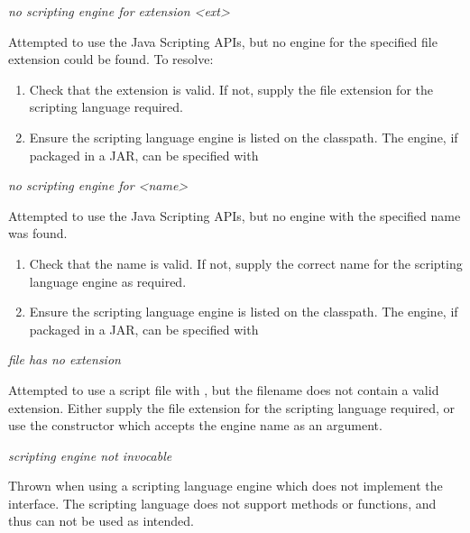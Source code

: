 \noindent
\textit{no scripting engine for extension <ext>}
\begin{indented}
  Attempted to use the Java Scripting APIs, but no engine for the specified file extension could be found.  To resolve:
  \begin{enumerate}
    \item Check that the extension is valid.  If not, supply the file extension for the scripting language required.
    \item Ensure the scripting language engine is listed on the classpath.  The engine, if packaged in a JAR, can be specified with
      \begin{indented}
      \end{indented}
  \end{enumerate}
\end{indented}

\noindent
\textit{no scripting engine for <name>}
\begin{indented}
  Attempted to use the Java Scripting APIs, but no engine with the specified name was found.
  \begin{enumerate}
    \item Check that the name is valid.  If not, supply the correct name for the scripting language engine as required.
    \item Ensure the scripting language engine is listed on the classpath.  The engine, if packaged in a JAR, can be specified with
      \begin{indented}
      \end{indented}
  \end{enumerate}
\end{indented}

\noindent
\textit{file has no extension}
\begin{indented}
  Attempted to use a script file with , but the filename does not contain a valid extension.  Either supply the file extension for the scripting language required, or use the constructor which accepts the engine name as an argument.
\end{indented}

\noindent
\textit{scripting engine not invocable}
\begin{indented}
  Thrown when using a scripting language engine which does not implement the  interface.  The scripting language does not support methods or functions, and thus can not be used as intended.
\end{indented}
  
